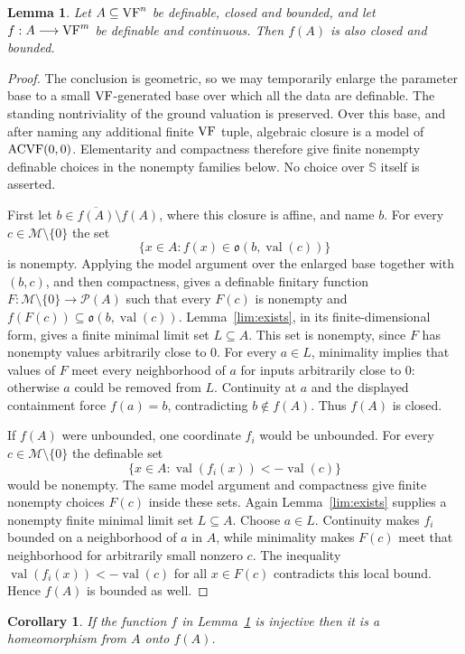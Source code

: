 \documentclass[12pt]{amsart}
\theoremstyle{plain}
\newtheorem{cor}[thm]{Corollary}
\newtheorem{lem}[thm]{Lemma}
\theoremstyle{definition}
\theoremstyle{remark}
\numberwithin{equation}{section}
\theoremstyle{plain}
\newcommand{\VF}{\textup{VF}}
\newcommand{\ACVF}{\textup{ACVF}}
\newcommand{\MM}{\mdl M}
\newcommand{\go}{\mathfrak{o}}
\newcommand{\0}{\emptyset}
\newcommand{\mdl}[1]{\mathcal{#1}}  %
\newcommand{\fun}{\longrightarrow}
\DeclareMathOperator{\vv}{val}
\begin{document}
\begin{lem}\label{cb:to:cb}
Let $A\subseteq\VF^n$ be definable, closed and bounded, and let $f:A\fun\VF^m$ be definable and continuous. Then $f(A)$ is also closed and bounded.
\end{lem}
\begin{proof}
The conclusion is geometric, so we may temporarily enlarge the parameter base to a small $\VF$-generated base over which all the data are definable. The standing nontriviality of the ground valuation is preserved. Over this base, and after naming any additional finite $\VF$ tuple, algebraic closure is a model of $\ACVF(0,0)$. Elementarity and compactness therefore give finite nonempty definable choices in the nonempty families below. No choice over $\mathbb S$ itself is asserted.

First let $b\in\overline{f(A)}\setminus f(A)$, where this closure is affine, and name $b$. For every $c\in\MM\setminus\{0\}$ the set
\[
\{x\in A:f(x)\in\go(b,\vv(c))\}
\]
is nonempty. Applying the model argument over the enlarged base together with $(b,c)$, and then compactness, gives a definable finitary function $F:\MM\setminus\{0\}\fun\mdl P(A)$ such that every $F(c)$ is nonempty and $f(F(c))\subseteq\go(b,\vv(c))$. Lemma~\ref{lim:exists}, in its finite-dimensional form, gives a finite minimal limit set $L\subseteq A$. This set is nonempty, since $F$ has nonempty values arbitrarily close to $0$. For every $a\in L$, minimality implies that values of $F$ meet every neighborhood of $a$ for inputs arbitrarily close to $0$: otherwise $a$ could be removed from $L$. Continuity at $a$ and the displayed containment force $f(a)=b$, contradicting $b\notin f(A)$. Thus $f(A)$ is closed.

If $f(A)$ were unbounded, one coordinate $f_i$ would be unbounded. For every $c\in\MM\setminus\{0\}$ the definable set
\[
\{x\in A:\vv(f_i(x))<-\vv(c)\}
\]
would be nonempty. The same model argument and compactness give finite nonempty choices $F(c)$ inside these sets. Again Lemma~\ref{lim:exists} supplies a nonempty finite minimal limit set $L\subseteq A$. Choose $a\in L$. Continuity makes $f_i$ bounded on a neighborhood of $a$ in $A$, while minimality makes $F(c)$ meet that neighborhood for arbitrarily small nonzero $c$. The inequality $\vv(f_i(x))<-\vv(c)$ for all $x\in F(c)$ contradicts this local bound. Hence $f(A)$ is bounded as well.
\end{proof}


\begin{cor}\label{conti:homeo}
If the function $f$ in Lemma~\ref{cb:to:cb} is injective then  it is a homeomorphism from $A$ onto $f(A)$.
\end{cor}
\end{document}
